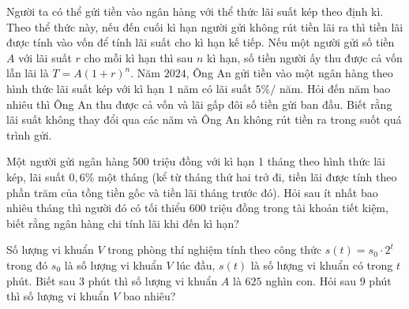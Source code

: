 \begin{ex}%
	[1,0 điểm] Người ta có thể gửi tiền vào ngân hàng với thể thức lãi suất  kép theo định kì. Theo thể thức này, nếu đến cuối kì hạn người gửi không rút tiền lãi ra thì tiền lãi được tính vào vốn để tính lãi suất cho kì hạn kế tiếp.
	Nếu một người gửi số tiền $A$ với lãi suất $r$ cho mỗi kì hạn thì sau $n$ kì hạn, số tiền người ấy thu được cả vốn lẫn lãi là $T=A(1+r)^n$. 
	Năm $2024$, Ông An gửi tiền vào một ngân hàng theo hình thức lãi suất kép với kì hạn $1$ năm có lãi suất $5\%/$ năm. Hỏi đến năm bao nhiêu thì Ông An thu được cả vốn và lãi gấp đôi  số tiền gửi ban đầu. Biết rằng lãi suất không thay đổi qua các năm và Ông An không rút tiền ra trong suốt quá trình gửi.
\end{ex}

\begin{ex}%
	Một người gửi ngân hàng 500 triệu đồng với kì hạn 1 tháng theo  hình thức lãi kép, lãi suất $0,6\%$ một tháng (kể từ tháng thứ hai trở đi, tiền lãi được tính theo phần trăm của tồng tiền gốc và tiền lãi tháng trước đó). Hỏi sau ít nhất bao nhiêu tháng thì người đó có tối thiểu 600 triệu đồng trong tài khoản tiết kiệm, biết rằng ngân hàng chi tính lãi khi đến kì hạn?
\end{ex}

\begin{ex}%
	Số lượng vi khuẩn $V$ trong phòng thí nghiệm tính theo công thức $s(t)=s_0\cdot 2^t$  trong đó $s_0$ là số lượng vi khuẩn $V$ lúc đầu, $s(t)$ là số lượng vi khuẩn có trong $t$ phút. Biết sau 3 phút thì số lượng vi khuẩn $A$ là $625$ nghìn con. Hỏi sau $9$ phút thì số lượng vi khuẩn $V$ bao nhiêu?
\end{ex}

